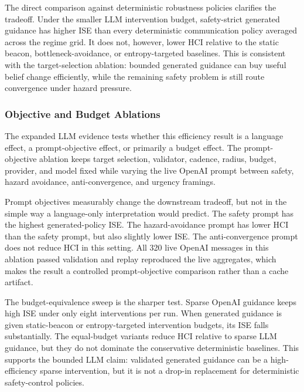 \llmRegimeComparisonTable

The direct comparison against deterministic robustness policies clarifies the
tradeoff. Under the smaller LLM intervention budget, safety-strict generated
guidance has higher ISE than every deterministic communication policy averaged
across the regime grid. It does not, however, lower HCI relative to the static
beacon, bottleneck-avoidance, or entropy-targeted baselines. This is
consistent with the target-selection ablation: bounded generated guidance can
buy useful belief change efficiently, while the remaining safety problem is
still route convergence under hazard pressure.

\subsubsection{Objective and Budget Ablations}
\label{subsec:llm-objective-budget}

The expanded LLM evidence tests whether this efficiency result is a language
effect, a prompt-objective effect, or primarily a budget effect. The
prompt-objective ablation keeps target selection, validator, cadence, radius,
budget, provider, and model fixed while varying the live OpenAI prompt between
safety, hazard avoidance, anti-convergence, and urgency framings.

\llmPromptObjectiveTable

Prompt objectives measurably change the downstream tradeoff, but not in the
simple way a language-only interpretation would predict. The safety prompt has
the highest generated-policy ISE. The hazard-avoidance prompt has lower HCI
than the safety prompt, but also slightly lower ISE. The anti-convergence
prompt does not reduce HCI in this setting. All 320 live OpenAI messages in
this ablation passed validation and replay reproduced the live aggregates,
which makes the result a controlled prompt-objective comparison rather than a
cache artifact.

\llmBudgetEquivalenceTable

The budget-equivalence sweep is the sharper test. Sparse OpenAI guidance keeps
high ISE under only eight interventions per run. When generated guidance is
given static-beacon or entropy-targeted intervention budgets, its ISE falls
substantially. The equal-budget variants reduce HCI relative to sparse LLM
guidance, but they do not dominate the conservative deterministic baselines.
This supports the bounded LLM claim: validated generated guidance can be a
high-efficiency sparse intervention, but it is not a drop-in replacement for
deterministic safety-control policies.

